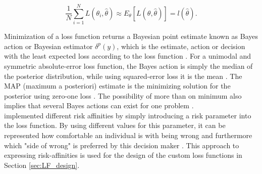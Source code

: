         \begin{equation}\label{eq:ExpectedLoss2}
        \frac{1}{N}\sum_{i=1}^{N} L(\theta_i,\hat{\theta}) \approx E_{\theta}[L(\theta,\hat{\theta})] = l(\hat{\theta}).
        \end{equation}
        
        Minimization of a loss function returns a Bayesian point estimate known as Bayes action or Bayesian estimator $\delta^p(y)$, which is the estimate, action or decision with the least expected loss according to the loss function \citep{berger2013stat, moye2006statistical}. For a unimodal and symmetric absolute-error loss function, the Bayes action is simply the median of the posterior distribution, while using squared-error loss it is the mean \citep{davidson2015, berger2013stat}. The MAP (maximum a posteriori) estimate is the minimizing solution for the posterior using zero-one loss \citep{davidson2015}. The possibility of more than on minimum also implies that several Bayes actions can exist for one problem \citep{berger2013stat}.\\
        \citet{davidson2015} implemented different risk affinities by simply  introducing a risk parameter into the loss function. By using different values for this parameter, it can be represented how comfortable an individual is with being wrong and furthermore which "side of wrong" is preferred by this decision maker \citep{davidson2015}. This approach to expressing risk-affinities is used for the design of the custom loss functions in Section \ref{sec:LF_design}.
        
        
